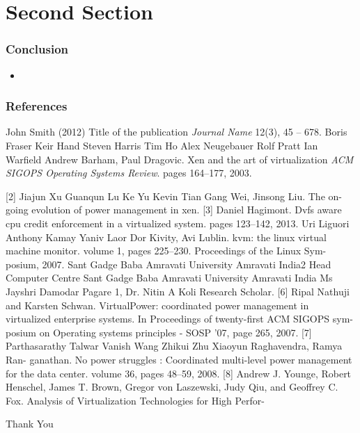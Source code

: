 \documentclass{beamer}
\begin{document}
\section{Second Section}
\begin{frame}
\frametitle{Conclusion}
\begin{itemize}
\item 
\end{itemize}
\end{frame}



\begin{frame}
\frametitle{References}
\footnotesize{
\begin{thebibliography}{99} %
 John Smith (2012)
\newblock Title of the publication
\newblock \emph{Journal Name} 12(3), 45 -- 678.
 Boris Fraser Keir Hand Steven Harris Tim Ho Alex Neugebauer Rolf Pratt Ian
Warfield Andrew Barham, Paul Dragovic. 
\newblock Xen and the art of virtualization
\newblock \emph{ACM SIGOPS Operating Systems Review}. pages 164–177, 2003.

[2] Jiajun Xu Guanqun Lu Ke Yu Kevin Tian Gang Wei, Jinsong Liu. The on-going
evolution of power management in xen.
[3] Daniel Hagimont. Dvfs aware cpu credit enforcement in a virtualized system. pages
123–142, 2013.
 Uri Liguori Anthony Kamay Yaniv Laor Dor Kivity, Avi Lublin. kvm: the linux
virtual machine monitor. volume 1, pages 225–230. Proceedings of the Linux Sym-
posium, 2007.
\bibitem{} Sant Gadge Baba Amravati University Amravati India2 Head Computer Centre Sant
Gadge Baba Amravati University Amravati India Ms Jayshri Damodar Pagare 1, Dr.
Nitin A Koli Research Scholar.
[6] Ripal Nathuji and Karsten Schwan. VirtualPower: coordinated power management
in virtualized enterprise systems. In Proceedings of twenty-first ACM SIGOPS sym-
posium on Operating systems principles - SOSP ’07, page 265, 2007.
[7] Parthasarathy Talwar Vanish Wang Zhikui Zhu Xiaoyun Raghavendra, Ramya Ran-
ganathan. No power struggles : Coordinated multi-level power management for the
data center. volume 36, pages 48–59, 2008.
[8] Andrew J. Younge, Robert Henschel, James T. Brown, Gregor von Laszewski, Judy
Qiu, and Geoffrey C. Fox. Analysis of Virtualization Technologies for High Perfor-

\end{thebibliography}
}
\end{frame}


\begin{frame}
\Huge{\centerline{Thank You}}
\end{frame}
\end{document}
